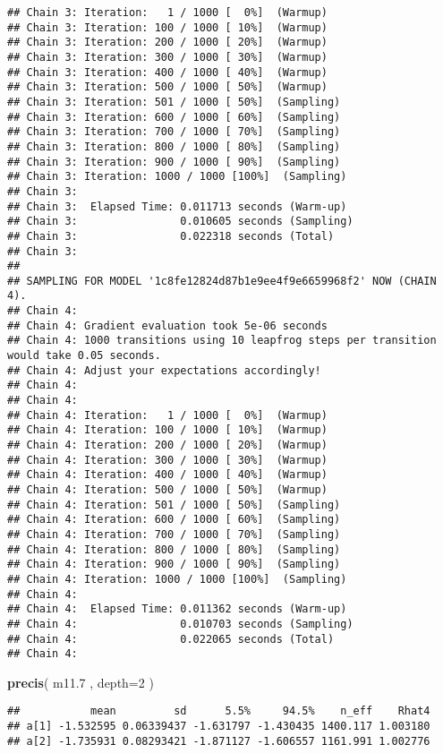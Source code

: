 \documentclass[]{article}
\newenvironment{Shaded}{\begin{snugshade}}{\end{snugshade}}
\newcommand{\KeywordTok}[1]{\textcolor[rgb]{0.13,0.29,0.53}{\textbf{{#1}}}}
\newcommand{\DataTypeTok}[1]{\textcolor[rgb]{0.13,0.29,0.53}{{#1}}}
\newcommand{\DecValTok}[1]{\textcolor[rgb]{0.00,0.00,0.81}{{#1}}}
\newcommand{\FloatTok}[1]{\textcolor[rgb]{0.00,0.00,0.81}{{#1}}}
\newcommand{\NormalTok}[1]{{#1}}
\begin{document}
\begin{verbatim}
## Chain 3: Iteration:   1 / 1000 [  0%]  (Warmup)
## Chain 3: Iteration: 100 / 1000 [ 10%]  (Warmup)
## Chain 3: Iteration: 200 / 1000 [ 20%]  (Warmup)
## Chain 3: Iteration: 300 / 1000 [ 30%]  (Warmup)
## Chain 3: Iteration: 400 / 1000 [ 40%]  (Warmup)
## Chain 3: Iteration: 500 / 1000 [ 50%]  (Warmup)
## Chain 3: Iteration: 501 / 1000 [ 50%]  (Sampling)
## Chain 3: Iteration: 600 / 1000 [ 60%]  (Sampling)
## Chain 3: Iteration: 700 / 1000 [ 70%]  (Sampling)
## Chain 3: Iteration: 800 / 1000 [ 80%]  (Sampling)
## Chain 3: Iteration: 900 / 1000 [ 90%]  (Sampling)
## Chain 3: Iteration: 1000 / 1000 [100%]  (Sampling)
## Chain 3: 
## Chain 3:  Elapsed Time: 0.011713 seconds (Warm-up)
## Chain 3:                0.010605 seconds (Sampling)
## Chain 3:                0.022318 seconds (Total)
## Chain 3: 
## 
## SAMPLING FOR MODEL '1c8fe12824d87b1e9ee4f9e6659968f2' NOW (CHAIN 4).
## Chain 4: 
## Chain 4: Gradient evaluation took 5e-06 seconds
## Chain 4: 1000 transitions using 10 leapfrog steps per transition would take 0.05 seconds.
## Chain 4: Adjust your expectations accordingly!
## Chain 4: 
## Chain 4: 
## Chain 4: Iteration:   1 / 1000 [  0%]  (Warmup)
## Chain 4: Iteration: 100 / 1000 [ 10%]  (Warmup)
## Chain 4: Iteration: 200 / 1000 [ 20%]  (Warmup)
## Chain 4: Iteration: 300 / 1000 [ 30%]  (Warmup)
## Chain 4: Iteration: 400 / 1000 [ 40%]  (Warmup)
## Chain 4: Iteration: 500 / 1000 [ 50%]  (Warmup)
## Chain 4: Iteration: 501 / 1000 [ 50%]  (Sampling)
## Chain 4: Iteration: 600 / 1000 [ 60%]  (Sampling)
## Chain 4: Iteration: 700 / 1000 [ 70%]  (Sampling)
## Chain 4: Iteration: 800 / 1000 [ 80%]  (Sampling)
## Chain 4: Iteration: 900 / 1000 [ 90%]  (Sampling)
## Chain 4: Iteration: 1000 / 1000 [100%]  (Sampling)
## Chain 4: 
## Chain 4:  Elapsed Time: 0.011362 seconds (Warm-up)
## Chain 4:                0.010703 seconds (Sampling)
## Chain 4:                0.022065 seconds (Total)
## Chain 4:
\end{verbatim}

\begin{Shaded}
\begin{Highlighting}[]
\KeywordTok{precis}\NormalTok{( m11}\FloatTok{.7} \NormalTok{, }\DataTypeTok{depth=}\DecValTok{2} \NormalTok{)}
\end{Highlighting}
\end{Shaded}

\begin{verbatim}
##           mean         sd      5.5%     94.5%    n_eff    Rhat4
## a[1] -1.532595 0.06339437 -1.631797 -1.430435 1400.117 1.003180
## a[2] -1.735931 0.08293421 -1.871127 -1.606557 1161.991 1.002776
\end{verbatim}
\end{document}
